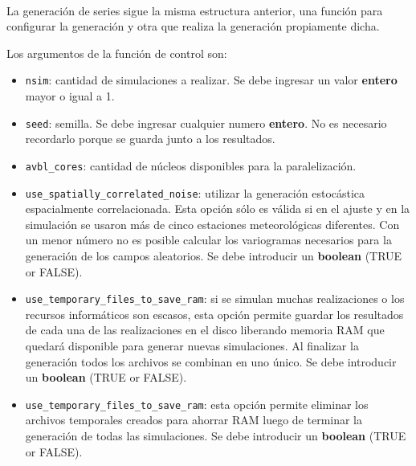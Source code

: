 \documentclass[
  12pt]{article}
\providecommand{\tightlist}{%
  \setlength{\itemsep}{0pt}\setlength{\parskip}{0pt}}
\begin{document}
~

La generación de series sigue la misma estructura anterior, una función para configurar la generación y otra que realiza la generación propiamente dicha.

Los argumentos de la función de control son:

\begin{itemize}
\tightlist
\item
  \texttt{nsim}: cantidad de simulaciones a realizar. Se debe ingresar un valor \textbf{entero} mayor o igual a 1.
\item
  \texttt{seed}: semilla. Se debe ingresar cualquier numero \textbf{entero}. No es necesario recordarlo porque se guarda junto a los resultados.
\item
  \texttt{avbl\_cores}: cantidad de núcleos disponibles para la paralelización.
\item
  \texttt{use\_spatially\_correlated\_noise}: utilizar la generación estocástica espacialmente correlacionada. Esta opción sólo es válida si en el ajuste y en la simulación se usaron más de cinco estaciones meteorológicas diferentes. Con un menor número no es posible calcular los variogramas necesarios para la generación de los campos aleatorios. Se debe introducir un \textbf{boolean} (TRUE or FALSE).
\item
  \texttt{use\_temporary\_files\_to\_save\_ram}: si se simulan muchas realizaciones o los recursos informáticos son escasos, esta opción permite guardar los resultados de cada una de las realizaciones en el disco liberando memoria RAM que quedará disponible para generar nuevas simulaciones. Al finalizar la generación todos los archivos se combinan en uno único. Se debe introducir un \textbf{boolean} (TRUE or FALSE).
\item
  \texttt{use\_temporary\_files\_to\_save\_ram}: esta opción permite eliminar los archivos temporales creados para ahorrar RAM luego de terminar la generación de todas las simulaciones. Se debe introducir un \textbf{boolean} (TRUE or FALSE).
\end{itemize}
\end{document}
